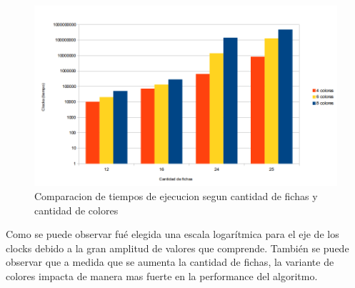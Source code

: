 \begin{figure}[h]
\begin{center}
\includegraphics[scale=0.7]{./img/ej3_performance.png}
\caption{Comparacion de tiempos de ejecucion segun cantidad de fichas y cantidad de colores}
\end{center}
\end{figure}

Como se puede observar fu\'e elegida una escala logar\'itmica para el eje de los clocks debido a la gran amplitud de valores que comprende. Tambi\'en se puede observar que a medida que se aumenta la cantidad de fichas, la variante de colores impacta de manera mas fuerte en la performance del algoritmo.
